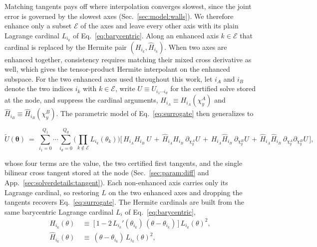\documentclass[
  aps,
  prd,
  twocolumn,
  10pt,
  amsmath,
  amssymb,
  nofootinbib,
  superscriptaddress,
  floatfix,
]{revtex4-2}
\newcommand{\vect}[1]{\boldsymbol{#1}}
\begin{document}
Matching tangents pays off where interpolation converges slowest, since the joint error is governed by the slowest axes (Sec.~\ref{sec:model:walls}).
We therefore enhance only a subset $\mathcal{E}$ of the axes and leave every other axis with its plain Lagrange cardinal $L_{i_k}$ of Eq.~\eqref{eq:barycentric}.
Along an enhanced axis $k\in\mathcal{E}$ that cardinal is replaced by the Hermite pair $(H_{i_k},\hat H_{i_k})$.
When two axes are enhanced together, consistency requires matching their mixed cross derivative as well, which gives the tensor-product Hermite interpolant on the enhanced subspace.
For the two enhanced
axes used throughout this work, let $i_A$ and $i_B$ denote the two indices $i_k$
with $k\in\mathcal{E}$, write $U\equiv U_{i_1\cdots i_d}$ for the
certified solve stored at the node, and suppress the cardinal arguments,
$H_{i_A}\equiv H_{i_A}(\chi^{A}_{y})$ and $\hat H_{i_B}\equiv\hat H_{i_B}(\chi^{B}_{y})$.
The parametric model of Eq.~\eqref{eq:surrogate} then generalizes to
\begin{widetext}
\begin{equation}
  \tilde U(\vect{\theta}) \ = \ \sum_{i_1=0}^{Q_1}\!\cdots\!\sum_{i_d=0}^{Q_d}
  \Bigg(\prod_{k\notin\mathcal{E}}\! L_{i_k}(\theta_k)\Bigg)
  \Big[\,
      H_{i_A}H_{i_B}\ U
    \, + \, \hat H_{i_A}H_{i_B}\ \partial_{\chi^{A}_{y}} U
    \, + \, H_{i_A}\hat H_{i_B}\ \partial_{\chi^{B}_{y}} U
    \, + \, \hat H_{i_A}\hat H_{i_B}\ \partial_{\chi^{A}_{y}}\partial_{\chi^{B}_{y}} U
  \,\Big],
  \label{eq:hermite}
\end{equation}
\end{widetext}
\addtocounter{footnote}{-1}%
whose four terms are the value, the two certified first tangents, and the single
bilinear cross tangent stored at the node (Sec.~\ref{sec:param:diff} and App.~\ref{sec:solverdetails:tangent}). Each
non-enhanced axis carries only its Lagrange cardinal, so restoring $L$ on the two
enhanced axes and dropping the tangents recovers
Eq.~\eqref{eq:surrogate}. The
Hermite cardinals are built from the same barycentric Lagrange cardinal $L_i$ of
Eq.~\eqref{eq:barycentric},
\begin{align}
  H_{i_k}(\theta) \ &\equiv \ \big[\,1 - 2\,L_{i_k}'(\theta_{i_k})\,(\theta-\theta_{i_k})\,\big]\,L_{i_k}(\theta)^2,
  \label{eq:hermite_cardinal_1} \\
  \hat H_{i_k}(\theta) \ &\equiv \ (\theta-\theta_{i_k})\,L_{i_k}(\theta)^2,
  \label{eq:hermite_cardinal_2}
\end{align}
\end{document}
